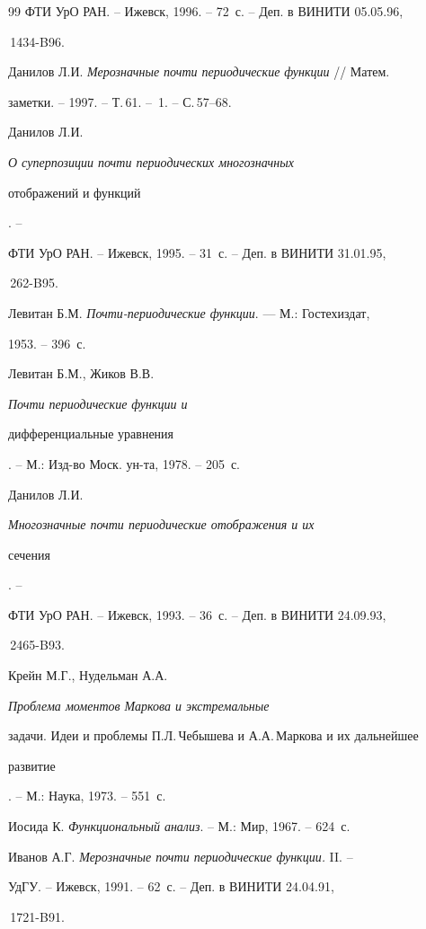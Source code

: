 \begin{thebibliography}{99}
ФТИ УрО РАН. -- Ижевск, 1996. -- 72~с. -- Деп. в ВИНИТИ 05.05.96,


\No\,1434-B96.




Данилов Л.И. {\em Мерозначные почти периодические функции} // Матем.


заметки. -- 1997. -- Т.\,61. -- \No\,1. -- С.\,57--68.




Данилов Л.И. {\em О суперпозиции почти периодических многозначных


отображений и функций}. --


ФТИ УрО РАН. -- Ижевск, 1995. -- 31~с. -- Деп. в ВИНИТИ 31.01.95,


\No\,262-B95.




Левитан Б.М. {\em Почти-периодические функции}. --- М.: Гостехиздат,


1953. -- 396~с.




Левитан Б.М., Жиков В.В. {\em Почти периодические функции и


дифференциальные уравнения}. -- М.: Изд-во Моск. ун-та, 1978. -- 205~с.




Данилов Л.И. {\em Многозначные почти периодические отображения и их


сечения}. --


ФТИ УрО РАН. -- Ижевск, 1993. -- 36~с. -- Деп. в ВИНИТИ 24.09.93,


\No\,2465-B93.




Крейн М.Г., Нудельман А.А. {\em Проблема моментов Маркова и экстремальные


задачи. Идеи и проблемы П.Л.\,Чебышева и А.А.\,Маркова и их дальнейшее


развитие}. -- М.: Наука, 1973. -- 551~с.




Иосида К. {\em Функциональный анализ}. -- М.: Мир, 1967. -- 624~с.




Иванов А.Г. {\em Мерозначные почти периодические функции.} II. --


УдГУ. -- Ижевск, 1991. -- 62~с. -- Деп. в ВИНИТИ 24.04.91,


\No\,1721-B91.





\end{thebibliography}
